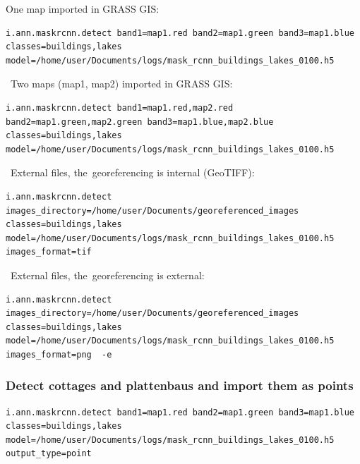 One map imported in GRASS GIS:

{\footnotesize
\begin{lstlisting}[breaklines=true]
i.ann.maskrcnn.detect band1=map1.red band2=map1.green band3=map1.blue classes=buildings,lakes model=/home/user/Documents/logs/mask_rcnn_buildings_lakes_0100.h5
\end{lstlisting}
}

\ \linebreak Two maps (map1, map2) imported in GRASS GIS:

{\footnotesize
\begin{lstlisting}[breaklines=true]
i.ann.maskrcnn.detect band1=map1.red,map2.red band2=map1.green,map2.green band3=map1.blue,map2.blue classes=buildings,lakes model=/home/user/Documents/logs/mask_rcnn_buildings_lakes_0100.h5
\end{lstlisting}
}

\ \linebreak External files, the~georeferencing is internal (GeoTIFF): 

{\footnotesize
\begin{lstlisting}[breaklines=true]
i.ann.maskrcnn.detect images_directory=/home/user/Documents/georeferenced_images classes=buildings,lakes model=/home/user/Documents/logs/mask_rcnn_buildings_lakes_0100.h5 images_format=tif
\end{lstlisting}
}

\ \linebreak External files, the~georeferencing is external: 

{\footnotesize
\begin{lstlisting}[breaklines=true]
i.ann.maskrcnn.detect images_directory=/home/user/Documents/georeferenced_images classes=buildings,lakes model=/home/user/Documents/logs/mask_rcnn_buildings_lakes_0100.h5 images_format=png  -e
\end{lstlisting}
}

\subsubsection*{Detect cottages and plattenbaus and import them as points}

{\footnotesize
\begin{lstlisting}[breaklines=true]
i.ann.maskrcnn.detect band1=map1.red band2=map1.green band3=map1.blue classes=buildings,lakes model=/home/user/Documents/logs/mask_rcnn_buildings_lakes_0100.h5 output_type=point
\end{lstlisting}
}


